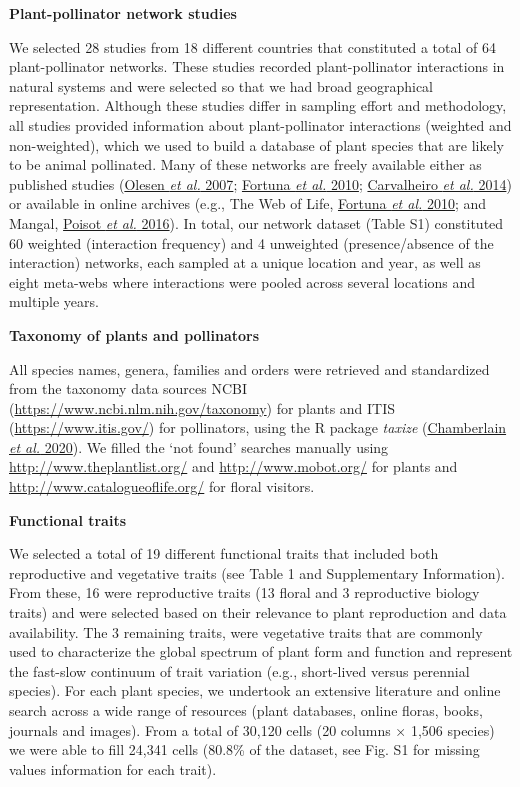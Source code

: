 \documentclass[
  12pt,
  a4paper,
]{article}
\begin{document}
\textbf{Plant-pollinator network studies}

We selected 28 studies from 18 different countries that constituted a total of 64 plant-pollinator networks. These studies recorded plant-pollinator interactions in natural systems and were selected so that we had broad geographical representation. Although these studies differ in sampling effort and methodology, all studies provided information about plant-pollinator interactions (weighted and non-weighted), which we used to build a database of plant species that are likely to be animal pollinated. Many of these networks are freely available either as published studies (\protect\hyperlink{ref-olesen2007}{Olesen \emph{et al.} 2007}; \protect\hyperlink{ref-fortuna2010}{Fortuna \emph{et al.} 2010}; \protect\hyperlink{ref-carvalheiro2014}{Carvalheiro \emph{et al.} 2014}) or available in online archives (e.g., The Web of Life, \protect\hyperlink{ref-fortuna2010}{Fortuna \emph{et al.} 2010}; and Mangal, \protect\hyperlink{ref-poisot2016}{Poisot \emph{et al.} 2016}). In total, our network dataset (Table S1) constituted 60 weighted (interaction frequency) and 4 unweighted (presence/absence of the interaction) networks, each sampled at a unique location and year, as well as eight meta-webs where interactions were pooled across several locations and multiple years.

\textbf{Taxonomy of plants and pollinators}

All species names, genera, families and orders were retrieved and standardized from the taxonomy data sources NCBI (\url{https://www.ncbi.nlm.nih.gov/taxonomy}) for plants and ITIS (\url{https://www.itis.gov/}) for pollinators, using the R package \emph{taxize} (\protect\hyperlink{ref-chamberlain2020}{Chamberlain \emph{et al.} 2020}). We filled the `not found' searches manually using \url{http://www.theplantlist.org/} and \url{http://www.mobot.org/} for plants and \url{http://www.catalogueoflife.org/} for floral visitors.

\textbf{Functional traits}

We selected a total of 19 different functional traits that included both reproductive and vegetative traits (see Table 1 and Supplementary Information). From these, 16 were reproductive traits (13 floral and 3 reproductive biology traits) and were selected based on their relevance to plant reproduction and data availability. The 3 remaining traits, were vegetative traits that are commonly used to characterize the global spectrum of plant form and function and represent the fast-slow continuum of trait variation (e.g., short-lived versus perennial species). For each plant species, we undertook an extensive literature and online search across a wide range of resources (plant databases, online floras, books, journals and images). From a total of 30,120 cells (20 columns × 1,506 species) we were able to fill 24,341 cells (80.8\% of the dataset, see Fig. S1 for missing values information for each trait).
\end{document}
